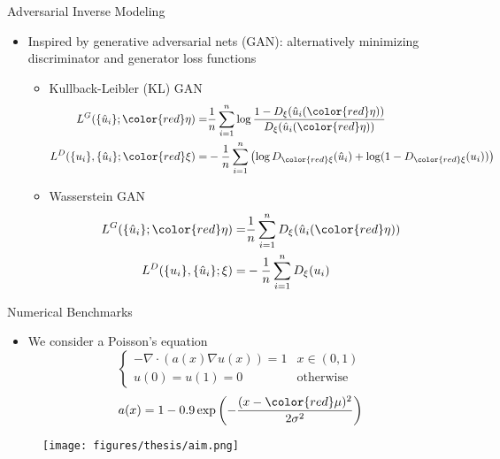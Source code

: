 \documentclass[usenames,dvipsnames]{beamer}
\begin{document}
\begin{frame}{Adversarial Inverse Modeling}
	\begin{itemize}
\item Inspired by generative adversarial nets (GAN): alternatively minimizing discriminator and generator loss functions
\begin{itemize}
\item Kullback-Leibler (KL) GAN
\begin{equation*}
	\begin{aligned}
		L^G(\{\hat u_i\}; {\color{red}\eta}) =&  \frac{1}{n}\sum_{i=1}^n \log\frac{ 1-D_{\xi}(\hat  u_i({\color{red}\eta}))}{D_{\xi}(\hat  u_i({\color{red}\eta}))} \\
		L^D(\{ u_i\}, \{\hat u_i\}; {\color{red}\xi}) =& -\frac{1}{n}\sum_{i=1}^n \left( \log D_{\color{red}\xi}(\hat  u_i) + \log(1-D_{\color{red}\xi}( u_i)) \right)
	\end{aligned} 
\end{equation*}
\item Wasserstein GAN
\begin{equation*}
\begin{aligned}
	L^G(\{\hat u_i\}; {\color{red}\eta}) =& \frac{1}{n}\sum_{i=1}^n D_{\xi}(\hat  u_i({\color{red}\eta})) \\
	L^D(\{ u_i\}, \{\hat u_i\}; \xi) =& -\frac{1}{n}\sum_{i=1}^n D_{\xi}( u_i)
\end{aligned}
\end{equation*}
\end{itemize}  
	\end{itemize}

\end{frame}


\begin{frame}{Numerical Benchmarks}

\begin{itemize}
\item We consider a Poisson's equation 
$$\begin{cases}
	-\nabla \cdot (a(x)\nabla u(x)) = 1 & x\in(0,1)\\
	u(0) = u(1) = 0 & \mbox{otherwise}
\end{cases}$$
$$a(x) = 1-0.9\exp\left( -\frac{(x-{\color{red}\mu})^2}{2{\sigma}^2} \right)$$
\end{itemize}
	\begin{figure}[htbp]
	\centering
	\texttt{[image: figures/thesis/aim.png]}
\end{figure}
\end{frame}
\end{document}
